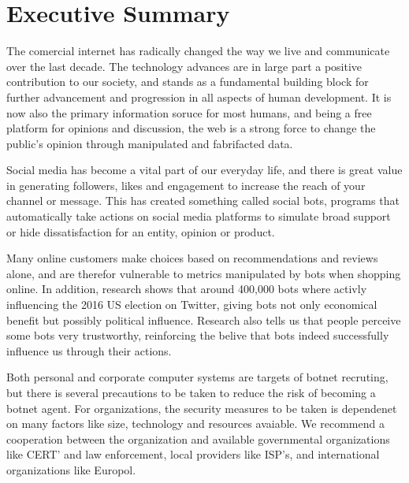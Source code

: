 \section*{Executive Summary}
The comercial internet has radically changed the way we live and communicate over the last decade. The technology advances are in large part a positive contribution to our society, and stands as a fundamental building block for further advancement and progression in all aspects of human development. It is now also the primary information soruce for most humans, and being a free platform for opinions and discussion, the web is a strong force to change the public's opinion through manipulated and fabrifacted data. 

Social media has become a vital part of our everyday life, and there is great value in generating followers, likes and engagement to increase the reach of your channel or message. This has created something called social bots, programs that automatically take actions on social media platforms to simulate broad support or hide dissatisfaction for an entity, opinion or product.

Many online customers make choices based on recommendations and reviews alone, and are therefor vulnerable to metrics manipulated by bots when shopping online. In addition, research shows that around 400,000 bots where activly influencing the 2016 US election on Twitter, giving bots not only economical benefit but possibly political influence. Research also tells us that people perceive some bots very trustworthy, reinforcing the belive that bots indeed successfully influence us through their actions.  

Both personal and corporate computer systems are targets of botnet recruting, but there is several precautions to be taken to reduce the risk of becoming a botnet agent. For organizations, the security measures to be taken is dependenet on many factors  like size, technology and resources avaiable. We recommend a cooperation between the organization and available governmental organizations like CERT' and law enforcement, local providers like ISP's, and international organizations like Europol.

